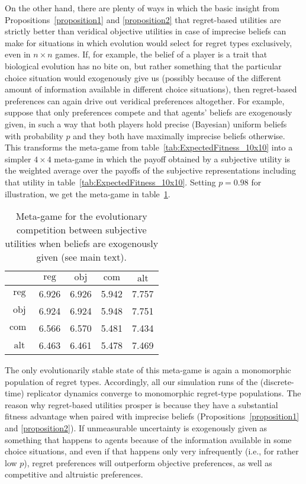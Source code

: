 \documentclass[fleqn,reqno,12pt]{article}
\theoremstyle{Satz}
\theoremstyle{Bsp}
\begin{document}
On the other hand, there are plenty of ways in which the basic insight from
Propositions~\ref{proposition1} and \ref{proposition2} that regret-based utilities are strictly better than
veridical objective utilities in case of imprecise beliefs can make for situations in which
evolution would select for regret types exclusively, even in $n \times n$ games. If, for
example, the belief of a player is a trait that biological evolution has no bite on, but rather
something that the particular choice situation would exogenously give us (possibly because of the different amount of information available in different choice situations), then regret-based
preferences can again drive out veridical preferences altogether. For example,
suppose that only preferences compete and that agents' beliefs are exogenously given,
in such a way that both players hold precise (Bayesian) uniform beliefs with probability $p$ and they both have maximally imprecise
beliefs otherwise. This transforms the meta-game from table~\ref{tab:ExpectedFitness_10x10} into a
simpler $4 \times 4$ meta-game in which the payoff obtained by a subjective utility is the weighted
average over the payoffs of the subjective representations including that utility in
table~\ref{tab:ExpectedFitness_10x10}. Setting $p = 0.98$ for illustration, we get the meta-game in table~\ref{tab:ExogeneousEpistemics}.
\begin{table}[]
\centering
\begin{tabular}{ccccc}
  \toprule
  & $\text{reg}$ 
  & $\text{obj}$
  & $\text{com}$
  & $\text{alt}$ \\ 
  \midrule
  $\text{reg} $ & 6.926 & 6.926 & 5.942 & 7.757 \\ 
  $\text{obj} $ & 6.924 & 6.924 & 5.948 & 7.751 \\ 
  $\text{com }$ & 6.566 & 6.570 & 5.481 & 7.434 \\ 
  $\text{alt} $ & 6.463 & 6.461 & 5.478 & 7.469 \\ 
   \bottomrule
\end{tabular}
\caption{Meta-game for the evolutionary competition between subjective utilities when beliefs are exogenously
  given (see main text).}
\label{tab:ExogeneousEpistemics}
\end{table}
The only evolutionarily stable state of this meta-game is again a monomorphic population of regret types. Accordingly, all
our simulation runs of the (discrete-time) replicator dynamics converge to monomorphic
regret-type populations. The reason why regret-based utilities prosper is because they have a substantial
fitness advantage when paired with imprecise beliefs (Propositions~\ref{proposition1} and \ref{proposition2}). If unmeasurable uncertainty is exogenously given
as something that happens to agents because of the information available in some choice situations, and even if that happens only very infrequently
(i.e., for rather low $p$), regret preferences will outperform objective preferences, as
well as competitive and altruistic preferences.
\end{document}

